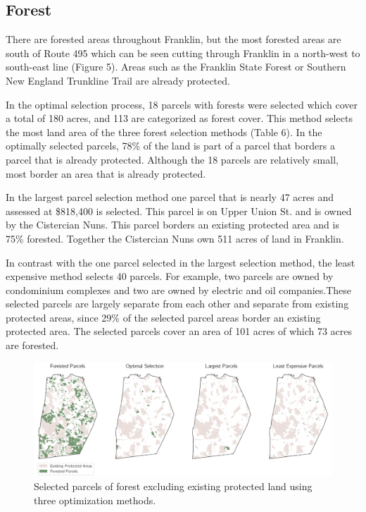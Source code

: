 \documentclass[12pt, stu, floatsintext,table]{apa7}
\begin{document}
\subsection{Forest}
 There are forested areas throughout Franklin, but the most forested areas are south of Route 495 which can be seen cutting through Franklin in a north-west to south-east line (Figure 5). Areas such as the Franklin State Forest or Southern New England Trunkline Trail are already protected.
 
 In the optimal selection process, 18 parcels with forests were selected which cover a total of 180 acres, and 113 are categorized as forest cover. This method selects the most land area of the three forest selection methods (Table 6). In the optimally selected parcels, 78\% of the land is part of a parcel that borders a parcel that is already protected. Although the 18 parcels are relatively small, most border an area that is already protected. 
 
 In the largest parcel selection method one parcel that is nearly 47 acres and assessed at \$818,400 is selected. This parcel is on Upper Union St. and is owned by the Cistercian Nuns. This parcel borders an existing protected area and is 75\% forested. Together the Cistercian Nuns own 511 acres of land in Franklin. 
 
 In contrast with the one parcel selected in the largest selection method, the least expensive method selects 40 parcels. For example, two parcels are owned by condominium complexes and two are owned by electric and oil companies.These selected parcels are largely separate from each other and separate from existing protected areas, since 29\% of the selected parcel areas border an existing protected area. The selected parcels cover an area of 101 acres of which 73 acres are forested.  
 
\begin{figure}[hbtp]
    \centering
    \includegraphics[width = \textwidth]{figures/n_61forest.png}
    \caption{Selected parcels of forest excluding existing protected land using three optimization methods. }
\end{figure}
\end{document}
